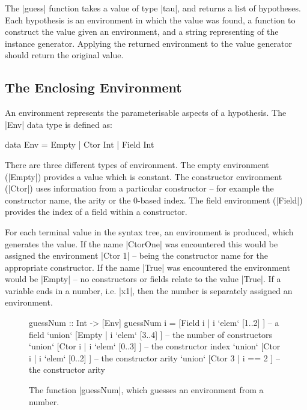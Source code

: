 \documentclass{llncs}
\begin{document}
The |guess| function takes a value of type |tau|, and returns a list of hypotheses. Each hypothesis is an environment in which the value was found, a function to construct the value given an environment, and a string representing of the instance generator. Applying the returned environment to the value generator should return the original value.


\subsection{The Enclosing Environment}
\label{sec:environment}

An environment represents the parameterisable aspects of a hypothesis. The |Env| data type is defined as:

\begin{code}
data Env = Empty | Ctor Int | Field Int
\end{code}

There are three different types of environment. The empty environment (|Empty|) provides a value which is constant. The constructor environment (|Ctor|) uses information from a particular constructor -- for example the constructor name, the arity or the 0-based index. The field environment (|Field|) provides the index of a field within a constructor.

For each terminal value in the syntax tree, an environment is produced, which generates the value. If the name |CtorOne| was encountered this would be assigned the environment |Ctor 1| -- being the constructor name for the appropriate constructor. If the name |True| was encountered the environment would be |Empty| -- no constructors or fields relate to the value |True|. If a variable ends in a number, i.e. |x1|, then the number is separately assigned an environment.

\begin{figure}[t]
\begin{code}
guessNum :: Int -> [Env]
guessNum i  =        [Field i  | i `elem` [1..2]  ]  -- a field
            `union`  [Empty    | i `elem` [3..4]  ]  -- the number of constructors
            `union`  [Ctor i   | i `elem` [0..3]  ]  -- the constructor index
            `union`  [Ctor i   | i `elem` [0..2]  ]  -- the constructor arity
            `union`  [Ctor 3   | i == 2           ]  -- the constructor arity
\end{code}
\caption{The function |guessNum|, which guesses an environment from a number.}
\label{fig:guessnum}
\end{figure}
\end{document}

